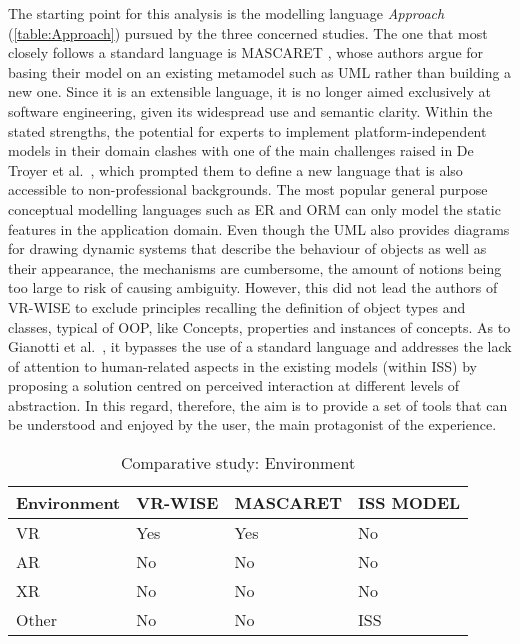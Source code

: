 The starting point for this analysis is the modelling language \textit{Approach} (\autoref{table:Approach}) pursued by the three concerned studies. The one that most closely follows a standard language is MASCARET \cite{chevaillier_semantic_2012}, whose authors argue for basing their model on an existing metamodel such as UML \cite{fowler_uml_2000} rather than building a new one. Since it is an extensible language, it is no longer aimed exclusively at software engineering, given its widespread use and semantic clarity. Within the stated strengths, the potential for experts to implement platform-independent models in their domain clashes with one of the main challenges raised in De Troyer et al.~\cite{de_troyer_conceptual_2007}, which prompted them to define a new language that is also accessible to non-professional backgrounds. 
The most popular general purpose conceptual modelling languages such as ER \cite{chen_context-aware_2019} and ORM \cite{halpin_conceptual_1995} can only model the static features in the application domain. Even though the UML also provides diagrams for drawing dynamic systems that describe the behaviour of objects as well as their appearance, the mechanisms are cumbersome, the amount of notions being too large to risk of causing ambiguity. However, this did not lead the authors of VR-WISE to exclude principles recalling the definition of object types and classes, typical of OOP, like Concepts, properties and instances of concepts. 
As to Gianotti et al.~\cite{dobbie_modeling_2020}, it bypasses the use of a standard language and addresses the lack of attention to human-related aspects in the existing models (within ISS) by proposing a solution centred on perceived interaction at different levels of abstraction. In this regard, therefore, the aim is to provide a set of tools that can be understood and enjoyed by the user, the main protagonist of the experience. 

\begin{table}
\begin{tabular}{|p{2.5cm}|p{3cm}|p{3cm}|p{3cm}|} 
\hline %
\textbf{Environment}
& \textbf{VR-WISE} 
& \textbf{MASCARET}
& \textbf{ISS MODEL} \\ 
\hline
VR
& Yes
& Yes
& No\\ 
\hline
AR
& No
& No
& No\\ 
\hline
XR
& No
& No
& No\\ 
\hline
Other
& No
& No
& ISS\\ 
\hline
\end{tabular} 
\caption{Comparative study: Environment}
\label{table:Environment}
\end{table}


